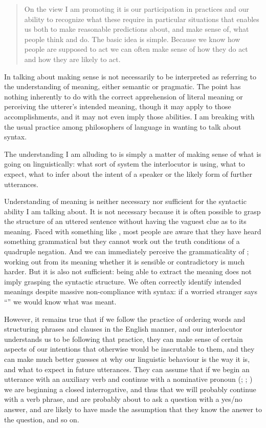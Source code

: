 \documentclass[output=paper]{langscibook}
\begin{document}
\begin{quote} On the view I am promoting it is our participation in practices and our ability to recognize what these require in particular situations that enables us both to make reasonable predictions about, and make sense of, what people think and do. The basic idea is simple. Because we know how people are supposed to act we can often make sense of how they do act and how they are likely to act. \end{quote} In talking about making sense {\Millar} is not necessarily to be interpreted as referring to the understanding of meaning, either semantic or pragmatic. The point has nothing inherently to do with the correct apprehension of literal meaning or perceiving the utterer's intended meaning, though it may apply to those accomplishments, and it may not even imply those abilities.  I am breaking with the usual practice among philosophers of language in wanting to talk about syntax.

The understanding I am alluding to is simply a matter of making sense of what is going on linguistically: what sort of system the interlocutor is using, what to expect, what to infer about the intent of a speaker or the likely form of further utterances.

Understanding of meaning is neither necessary nor sufficient for the syntactic ability I am talking about.  It is not necessary because it is often possible to grasp the structure of an uttered sentence without having the vaguest clue as to its meaning.  Faced with something like , most people are aware that they have heard something grammatical but they cannot work out the truth conditions of a quadruple negation.  And we can immediately perceive the grammaticality of ; working out from its meaning whether it is sensible or contradictory is much harder.  But it is also not sufficient: being able to extract the meaning does not imply grasping the syntactic structure.  We often correctly identify intended meanings despite massive non-compliance with syntax: if a worried stranger says ``'' we would know what was meant.

However, it remains true that if we follow the practice of ordering words and structuring phrases and clauses in the English manner, and our interlocutor understands us to be following that practice, they can make sense of certain aspects of our intentions that otherwise would be inscrutable to them, and they can make much better guesses at why our linguistic behaviour is the way it is, and what to expect in future utterances.  They can assume that if we begin an utterance with an auxiliary verb and continue with a nominative pronoun (; ; ) we are beginning a closed interrogative, and thus that we will probably continue with a verb phrase, and are probably about to ask a question with a yes/no answer, and are likely to have made the assumption that they know the answer to the question, and so on.
\end{document}
